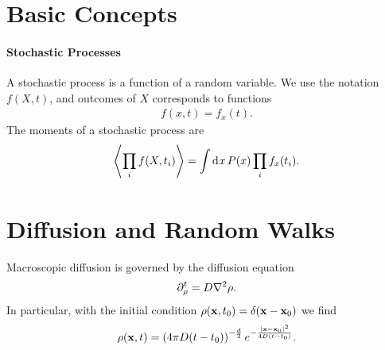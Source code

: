 \section{Basic Concepts}

\paragraph{Stochastic Processes}
A stochastic process is a function of a random variable. We use the notation $f(X, t)$, and outcomes of $X$ corresponds to functions
\begin{align*}
	f(x, t) = f_{x}(t).
\end{align*}
The moments of a stochastic process are
\begin{align*}
	\expval{\prod\limits_{i}f(X, t_{i})} = \int\limits_{}^{}\dd[]{x}P(x)\prod\limits_{i}f_{x}(t_{i}).
\end{align*}

\section{Diffusion and Random Walks}
Macroscopic diffusion is governed by the diffusion equation
\begin{align*}
	\del{t}{\rho} = D\laplacian{\rho}.
\end{align*}
In particular, with the initial condition $\rho(\vb{x}, t_{0}) = \delta(\vb{x} - \vb{x}_{0})$ we find
\begin{align*}
	\rho(\vb{x}, t) = \left(4\pi D(t - t_{0})\right)^{-\frac{d}{2}}e^{-\frac{\abs{\vb{x} - \vb{x}_{0}}^{2}}{4D(t - t_{0})}}.
\end{align*}

